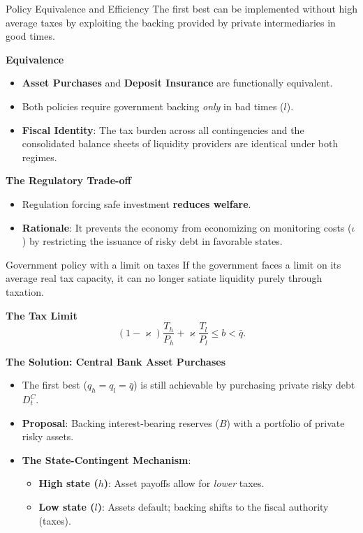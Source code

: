 \documentclass[11pt,aspectratio=169]{beamer}
\begin{document}
\begin{frame}{Policy Equivalence and Efficiency}
\small
The first best can be implemented without high average taxes by exploiting the backing provided by private intermediaries in good times.

\vspace{0.3cm}
\textbf{\textcite{wallace1981} Equivalence}
\begin{itemize}
    \item \textbf{Asset Purchases} and \textbf{Deposit Insurance} are functionally equivalent.
    \item Both policies require government backing \textit{only} in bad times ($l$).
    \item \textbf{Fiscal Identity}: The tax burden across all contingencies and the consolidated balance sheets of liquidity providers are identical under both regimes.
\end{itemize}

\vspace{0.3cm}
\textbf{The Regulatory Trade-off}
\begin{itemize}
    \item Regulation forcing safe investment \textbf{reduces welfare}.
    \item \textbf{Rationale}: It prevents the economy from economizing on monitoring costs ($\iota$) by restricting the issuance of risky debt in favorable states.
\end{itemize}
\end{frame}
\begin{frame}{Government policy with a limit on taxes}
\small
If the government faces a limit on its average real tax capacity, it can no longer satiate liquidity purely through taxation.

\vspace{0.2cm}
\textbf{The Tax Limit}
\begin{equation}
\left( 1-\varkappa \right) \frac{T_{h}}{P_{h}}+\varkappa \frac{T_{l}}{P_{l}} \leq b < \bar{q}. \label{Limit_on_taxes}
\end{equation}

\vspace{0.2cm}
\textbf{The Solution: Central Bank Asset Purchases}
\begin{itemize}
    \item The first best ($q_h = q_l = \bar{q}$) is still achievable by purchasing private risky debt $D_t^C$.
    \item \textbf{\textcite{friedman1960program} Proposal}: Backing interest-bearing reserves ($B$) with a portfolio of private risky assets.
    \item \textbf{The State-Contingent Mechanism}:
    \begin{itemize}
        \item \textbf{High state ($h$)}: Asset payoffs allow for \textit{lower} taxes.
        \item \textbf{Low state ($l$)}: Assets default; backing shifts to the fiscal authority (taxes).
    \end{itemize}
\end{itemize}
\end{frame}
\end{document}
